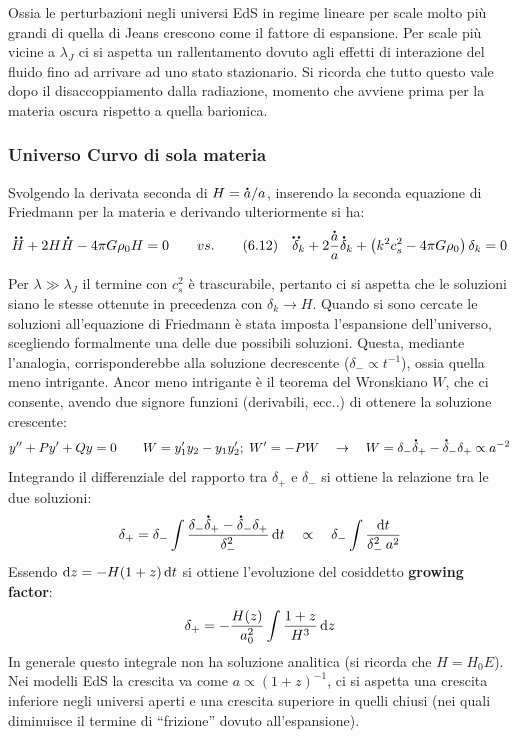 Ossia le perturbazioni negli universi EdS in regime lineare per scale molto più grandi di quella di Jeans crescono come il fattore di espansione. Per scale più vicine a $\lambda_J$ ci si aspetta un rallentamento dovuto agli effetti di interazione del fluido fino ad arrivare ad uno stato stazionario. Si ricorda che tutto questo vale dopo il disaccoppiamento dalla radiazione, momento che avviene prima per la materia oscura rispetto a quella barionica.

\subsubsection{Universo Curvo di sola materia}
Svolgendo la derivata seconda di $H=\accentset{\mbox{\large\bfseries .}}{a} / a$, inserendo la seconda equazione di Friedmann per la materia e derivando ulteriormente si ha:
\begin{equation*}
    \accentset{\mbox{\large\bfseries ..}}{H}+2H\accentset{\mbox{\large\bfseries .}}{H}-4\pi G \rho_0 H = 0 \qquad vs. \qquad (6.12) \quad \accentset{\mbox{\large\bfseries ..}}{\delta}_k + 2 \frac{\accentset{\mbox{\large\bfseries .}}{a}}{a}\accentset{\mbox{\large\bfseries .}}{\delta}_k + \left( k^2 c_s^2 -4\pi G \rho_0\right) \delta_k  =0
\end{equation*}

Per $\lambda \gg \lambda_J$ il termine con $c_s^2$ è trascurabile, pertanto ci si aspetta che le soluzioni siano le stesse ottenute in precedenza con $\delta_k \rightarrow H$. Quando si sono cercate le soluzioni all'equazione di Friedmann è stata imposta l'espansione dell'universo, scegliendo formalmente una delle due possibili soluzioni. Questa, mediante l'analogia, corrisponderebbe alla soluzione decrescente ($\delta_- \propto t^{-1}$), ossia quella meno intrigante. Ancor meno intrigante è il teorema del Wronskiano $W$, che ci consente, avendo due signore funzioni (derivabili, ecc..) di ottenere la soluzione crescente:
$$
y''+Py'+Qy=0 \qquad W=y_1'y_2 - y_1y_2'; \; W'=-PW \quad \rightarrow \quad W=\delta_-\accentset{\mbox{\large\bfseries .}}{\delta}_+ - \accentset{\mbox{\large\bfseries .}}{\delta}_-\delta_+ \propto a^{-2}
$$
Integrando il differenziale del rapporto tra $\delta_+$ e $\delta_-$ si ottiene la relazione tra le due soluzioni:
\begin{equation*}
    \delta_+ = \delta_- \int \frac{\delta_-\accentset{\mbox{\large\bfseries .}}{\delta}_+ - \accentset{\mbox{\large\bfseries .}}{\delta}_-\delta_+}{\delta_-^2}\operatorname{d}\!{t}\quad\propto\quad \delta_- \int \frac{\operatorname{d}\!{t}}{\delta_-^2\: a^2}
\end{equation*}
Essendo $\operatorname{d}\!{z}=-H(1+z)\operatorname{d}\!{t}$ si ottiene l'evoluzione del cosiddetto \textbf{growing factor}:
\begin{equation}
    \delta_+ = -\frac{H(z)}{a_0^2}\int \frac{1+z}{H^3}\operatorname{d}\!{z}
\end{equation}
In generale questo integrale non ha soluzione analitica (si ricorda che $H=H_0 E$). Nei modelli EdS la crescita va come $a\propto (1+z)^{-1}$, ci si aspetta una crescita inferiore negli universi aperti e una crescita superiore in quelli chiusi (nei quali diminuisce il termine di ``frizione'' dovuto all'espansione).

